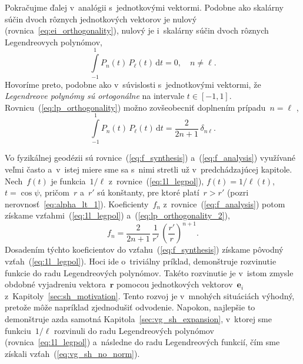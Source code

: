 \documentclass[a4paper, 12pt]{book}
\newcommand{\diff}{\mathrm d}
\let\vec\mathbf
\begin{document}
Pokračujme ďalej v~analógii s~jednotkovými vektormi.  Podobne ako skalárny 
súčin dvoch rôznych jednotkových vektorov je nulový 
(rovnica~\ref{eq:ei_orthogonality}), nulový je i~skalárny súčin dvoch rôznych 
Legendreovych polynómov,
%
\begin{equation}
\label{eq:lp_orthogonality}
\int\limits_{-1}^1 P_n(t) \, P_\ell(t) \, \diff t = 0{,} \quad n \neq \ell{.}
\end{equation}
%
Hovoríme preto, podobne ako v~súvislosti s~jednotkovými vektormi, že
\emph{Legendreove polynómy sú ortogonálne} na intervale $t \in [-1, 1].$
Rovnicu~(\ref{eq:lp_orthogonality}) možno zovšeobecniť doplnením prípadu~$n
= \ell$ \parencite[napríklad][]{Hobson},
%
\begin{equation}
\label{eq:lp_orthogonality_2}
\int\limits_{-1}^1 P_n(t) \, P_\ell(t) \, \diff t = \frac{2}{2n + 1} \, 
\delta_{n\ell}{.}
\end{equation}

Vo fyzikálnej geodézii sú rovnice~(\ref{eq:f_synthesis}) 
a~(\ref{eq:f_analysis}) využívané veľmi často a~v~istej miere sme sa s~nimi 
stretli už v~predchádzajúcej kapitole.  Nech~$f(t)$ je funkcia~$1 \slash \ell$ 
z~rovnice~(\ref{eq:1l_legpol}), $f(t) = 1 \slash \ell(t)$, $t = \cos\psi$, 
pričom~$r$ a~$r'$ sú konštanty, pre ktoré platí~$r > r'$ (pozri 
nerovnosť~\ref{eq:alpha_lt_1}).  Koeficienty~$f_n$ 
z~rovnice~(\ref{eq:f_analysis}) potom získame vzťahmi~(\ref{eq:1l_legpol}) 
a~(\ref{eq:lp_orthogonality_2}),
%
\begin{equation}
f_n = \frac{2}{2n + 1} \, \frac{1}{r'} \, \left( \frac{r'}{r} \right)^{n
+ 1}{.}
\end{equation}
%
Dosadením týchto koeficientov do vzťahu~(\ref{eq:f_synthesis}) získame pôvodný 
vzťah~(\ref{eq:1l_legpol}).  Hoci ide o~triviálny príklad, demonštruje 
rozvinutie funkcie do radu Legendreových polynómov.  Takéto rozvinutie je 
v~istom zmysle obdobné vyjadreniu vektora~$\vec r$ pomocou jednotkových 
vektorov~$\vec e_i$ z~Kapitoly~\ref{sec:sh_motivation}.  Tento rozvoj je 
v~mnohých situáciách výhodný, pretože môže napríklad zjednodušiť odvodenie.  
Napokon, najlepšie to demonštruje azda samotná 
Kapitola~\ref{sec:vg_sh_expansion}, v~ktorej sme funkciu~$1 \slash \ell$ 
rozvinuli do radu Legendreových polynómov (rovnica~\ref{eq:1l_legpol}) 
a~následne do radu Legendreových funkcií, čím sme získali 
vzťah~(\ref{eq:vg_sh_no_norm}).
\end{document}
